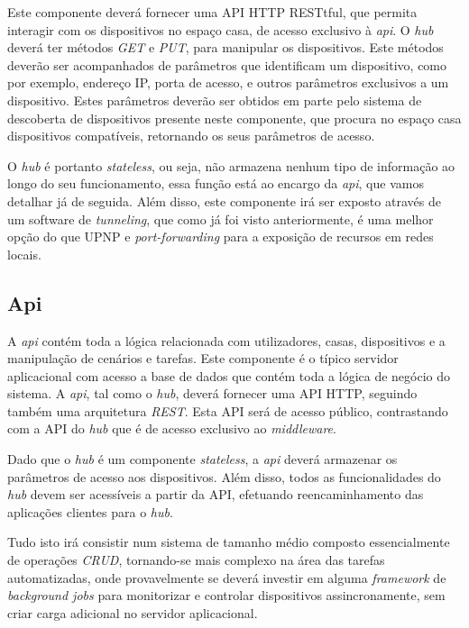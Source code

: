 Este componente deverá fornecer uma API HTTP RESTtful, que permita interagir com os dispositivos no espaço casa, de acesso exclusivo à \textit{api}. O \textit{hub} deverá ter métodos \textit{GET} e \textit{PUT}, para manipular os dispositivos. Este métodos deverão ser acompanhados de parâmetros que identificam um dispositivo, como por exemplo, endereço IP, porta de acesso, e outros parâmetros exclusivos a um dispositivo. Estes parâmetros deverão ser obtidos em parte pelo sistema de descoberta de dispositivos presente neste componente, que procura no espaço casa dispositivos compatíveis, retornando os seus parâmetros de acesso.

O \textit{hub} é portanto \textit{stateless}, ou seja, não armazena nenhum tipo de informação ao longo do seu funcionamento, essa função está ao encargo da \textit{api}, que vamos detalhar já de seguida. Além disso, este componente irá ser exposto através de um software de \textit{tunneling}, que como já foi visto anteriormente, é uma melhor opção do que UPNP e \textit{port-forwarding} para a exposição de recursos em redes locais.

\subsection{Api}

A \textit{api} contém toda a lógica relacionada com utilizadores, casas, dispositivos e a manipulação de cenários e tarefas. Este componente é o típico servidor aplicacional com acesso a base de dados que contém toda a lógica de negócio do sistema. A \textit{api}, tal como o \textit{hub}, deverá fornecer uma API HTTP, seguindo também uma arquitetura \textit{REST}. Esta API será de acesso público, contrastando com a API do \textit{hub} que é de acesso exclusivo ao \textit{middleware}.

Dado que o \textit{hub} é um componente \textit{stateless}, a \textit{api} deverá armazenar os parâmetros de acesso aos dispositivos. Além disso, todos as funcionalidades do \textit{hub} devem ser acessíveis a partir da API, efetuando reencaminhamento das aplicações clientes para o \textit{hub}.

Tudo isto irá consistir num sistema de tamanho médio composto essencialmente de operações \textit{CRUD}, tornando-se mais complexo na área das tarefas automatizadas, onde provavelmente se deverá investir em alguma \textit{framework} de \textit{background jobs} para monitorizar e controlar dispositivos assincronamente, sem criar carga adicional no servidor aplicacional.


